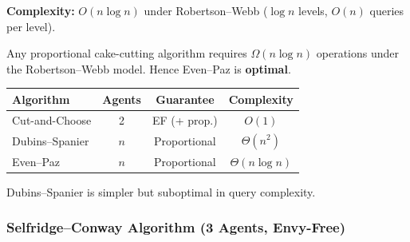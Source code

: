 \textbf{Complexity:} $O(n \log n)$ under Robertson--Webb ($\log n$ levels, $O(n)$ queries per level).

\begin{thmbox}
Any proportional cake-cutting algorithm requires $\Omega(n \log n)$ operations under the Robertson--Webb model. Hence Even--Paz is \textbf{optimal}.
\end{thmbox}

\begin{tipbox}
\begin{center}
\begin{tabular}{lccc}
\toprule
\textbf{Algorithm} & \textbf{Agents} & \textbf{Guarantee} & \textbf{Complexity} \\
\midrule
Cut-and-Choose & 2 & EF (+ prop.) & $O(1)$ \\
Dubins--Spanier & $n$ & Proportional & $\Theta(n^2)$ \\
Even--Paz & $n$ & Proportional & $\Theta(n \log n)$ \\
\bottomrule
\end{tabular}
\end{center}
Dubins--Spanier is simpler but suboptimal in query complexity.
\end{tipbox}

\separator

\subsubsection{Selfridge--Conway Algorithm (3 Agents, Envy-Free)}

